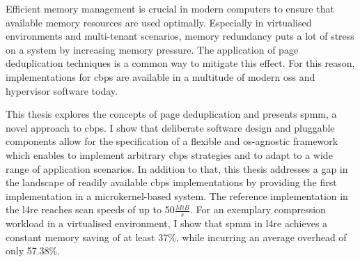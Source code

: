 Efficient memory management is crucial in modern computers to ensure that available memory resources are used optimally.
Especially in virtualised environments and multi-tenant scenarios, memory redundancy puts a lot of stress on a system by increasing memory pressure.
The application of page deduplication techniques is a common way to mitigate this effect.
For this reason, implementations for \ac{cbps} are available in a multitude of modern \acp{os} and hypervisor software today.

This thesis explores the concepts of page deduplication and presents \acs{spmm}, a novel approach to \ac{cbps}.
I show that deliberate software design and pluggable components allow for the specification of a flexible and \ac{os}-agnostic framework which enables to implement arbitrary \ac{cbps} strategies and to adapt to a wide range of application scenarios.
In addition to that, this thesis addresses a gap in the landscape of readily available \ac{cbps} implementations by providing the first implementation in a microkernel-based system.
The reference implementation in the \acf{l4re} reaches scan speeds of up to 50$\frac{MiB}{s}$.
For an exemplary compression workload in a virtualised environment, I show that \acs{spmm} in \acs{l4re} achieves a constant memory saving of at least 37\%, while incurring an average overhead of only 57.38\%.
